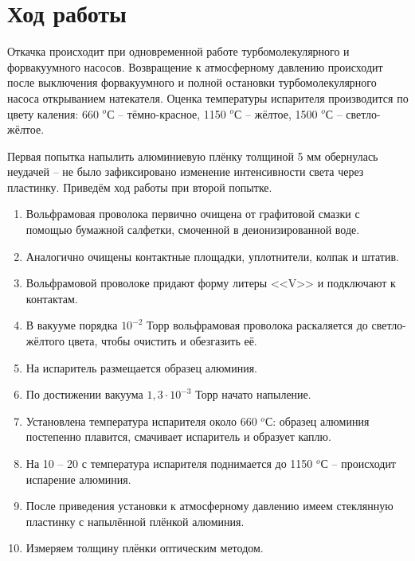 \documentclass[a4paper, 14pt]{extarticle}
\begin{document}
		
	\section{Ход работы}
	
		\hspace{5mm}Откачка происходит при одновременной работе турбомолекулярного и форвакуумного насосов. Возвращение к атмосферному давлению происходит после выключения форвакуумного и полной остановки турбомолекулярного насоса открыванием натекателя. Оценка температуры испарителя производится по цвету каления: 660 $^o$С -- тёмно-красное, 1150 $^o$С -- жёлтое, 1500 $^o$С -- светло-жёлтое.
		
		Первая попытка напылить алюминиевую плёнку толщиной 5 мм обернулась неудачей -- не было зафиксировано изменение интенсивности света через пластинку. Приведём ход работы при второй попытке. 
	
	\begin{enumerate}
		\item Вольфрамовая проволока первично очищена от графитовой смазки с помощью бумажной салфетки, смоченной в деионизированной воде.
		
		\item Аналогично очищены контактные площадки, уплотнители, колпак и штатив.
		
		\item  Вольфрамовой проволоке придают форму литеры <<V>> и подключают к контактам. 
		
		\item  В вакууме порядка $10^{-2}$ Торр вольфрамовая проволока раскаляется до светло-жёлтого цвета, чтобы очистить и обезгазить её.
		
		\item На испаритель размещается образец алюминия.
		
		\item  По достижении вакуума $1,3 \cdot 10^{-3}$ Торр начато напыление.
		
		\item  Установлена температура испарителя около 660 $^o$С: образец алюминия постепенно плавится, смачивает испаритель и образует каплю.
		
		\item  На 10 -- 20 с температура испарителя поднимается до 1150 $^o$С -- происходит испарение алюминия.
		
		\item  После приведения установки к атмосферному давлению имеем стеклянную пластинку с напылённой плёнкой алюминия.
		
		\item  Измеряем толщину плёнки оптическим методом.
		
	\end{enumerate} 
		
\end{document}
